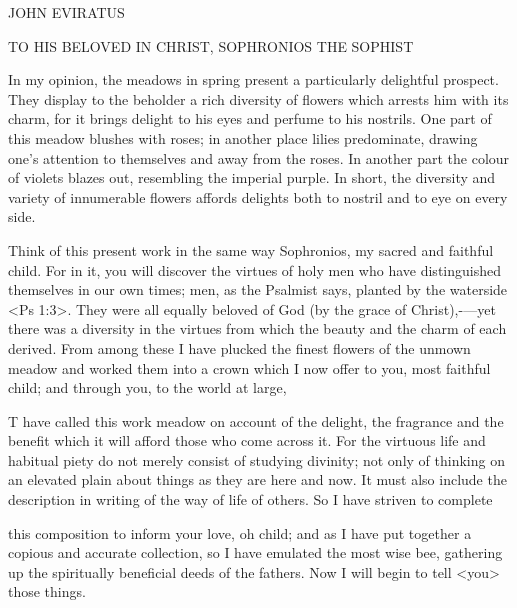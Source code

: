JOHN EVIRATUS

TO HIS BELOVED IN CHRIST,
SOPHRONIOS THE SOPHIST

In my opinion, the meadows in spring present a particularly
delightful prospect. They display to the beholder a rich diversity of
flowers which arrests him with its charm, for it brings delight to his
eyes and perfume to his nostrils. One part of this meadow blushes
with roses; in another place lilies predominate, drawing one’s
attention to themselves and away from the roses. In another part
the colour of violets blazes out, resembling the imperial purple. In
short, the diversity and variety of innumerable flowers affords
delights both to nostril and to eye on every side.

Think of this present work in the same way Sophronios, my
sacred and faithful child. For in it, you will discover the virtues of
holy men who have distinguished themselves in our own times; men,
as the Psalmist says, planted by the waterside <Ps 1:3>. They were
all equally beloved of God (by the grace of Christ),-—yet there was
a diversity in the virtues from which the beauty and the charm of
each derived. From among these I have plucked the finest flowers
of the unmown meadow and worked them into a crown which I
now offer to you, most faithful child; and through you, to the world
at large,

T have called this work meadow on account of the delight, the
fragrance and the benefit which it will afford those who come across
it. For the virtuous life and habitual piety do not merely consist of
studying divinity; not only of thinking on an elevated plain about
things as they are here and now. It must also include the description
in writing of the way of life of others. So I have striven to complete

this composition to inform your love, oh child; and as I have put
together a copious and accurate collection, so I have emulated the
most wise bee, gathering up the spiritually beneficial deeds of the
fathers. Now I will begin to tell <you> those things.
